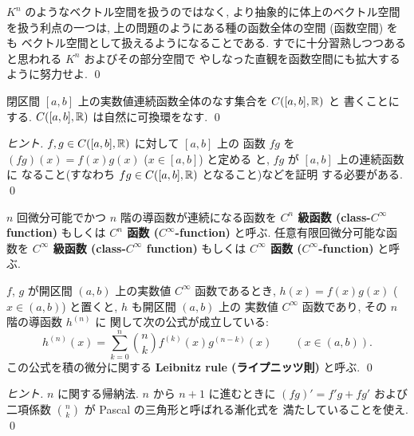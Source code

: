 \documentclass[12pt,twoside]{jarticle}
\begin{document}
\begin{guide}
  $K^n$ のようなベクトル空間を扱うのではなく, 
  より抽象的に体上のベクトル空間を扱う利点の一つは, 
  上の問題のようにある種の函数全体の空間 (函数空間) をも
  ベクトル空間として扱えるようになることである.
  すでに十分習熟しつつあると思われる $K^n$ およびその部分空間で
  やしなった直観を函数空間にも拡大するように努力せよ.
  \qed
\end{guide}


\begin{question}[連続函数全体のなす可換環]
  \label{q:C0-2}
  閉区間 $[a,b]$ 上の実数値連続函数全体のなす集合を $C([a,b],{\mathbb R})$ と
  書くことにする. $C([a,b],{\mathbb R})$ は自然に可換環をなす.
  \qed
\end{question}

\begin{proof}[ヒント]
  $f,g\in C([a,b],{\mathbb R})$ に対して $[a,b]$ 上の
  函数 $fg$ を $(fg)(x)=f(x)g(x)$ ($x\in[a,b]$) と定める
  と, $fg$ が $[a,b]$ 上の連続函数に
  なること(すなわち $fg\in C([a,b],{\mathbb R})$ となること)などを証明
  する必要がある.
  \qed
\end{proof}


$n$ 回微分可能でかつ $n$ 階の導函数が連続になる函数を 
{\bf $C^n$ 級函数 (class-$C^\infty$ function)} 
もしくは 
{\bf $C^n$ 函数 ($C^\infty$-function)} と呼ぶ.  
任意有限回微分可能な函数を 
{\bf $C^\infty$ 級函数 (class-$C^\infty$ function)}
もしくは 
{\bf $C^\infty$ 函数 ($C^\infty$-function)} と呼ぶ.

\begin{question}
  \label{q:Leibnitz-rule}
  $f$, $g$ が開区間 $(a,b)$ 上の実数値 $C^\infty$ 函数であるとき, %
  $h(x)=f(x)g(x)$ ($x\in(a,b)$) と置くと, $h$ も開区間 $(a,b)$ 上の
  実数値 $C^\infty$ 函数であり, その $n$ 階の導函数 $h^{(n)}$ に
  関して次の公式が成立している:
  \begin{equation*}
    h^{(n)}(x) = \sum_{k=0}^n \binom{n}{k} f^{(k)}(x) g^{(n-k)}(x)
    \qquad (x\in(a,b)).
  \end{equation*}
  この公式を積の微分に関する {\bf Leibnitz rule (ライプニッツ則)}
  と呼ぶ. \qed
\end{question}

\begin{proof}[ヒント]
  $n$ に関する帰納法.
  $n$ から $n+1$ に進むときに $(fg)' = f'g + fg'$ および
  二項係数 $\binom{n}{k}$ が Pascal の三角形と呼ばれる漸化式を
  満たしていることを使え.
  \qed
\end{proof}
\end{document}
